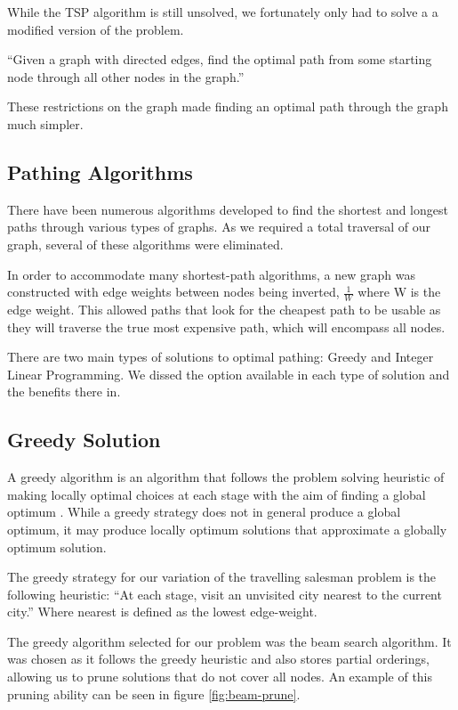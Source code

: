 \documentclass[bsc,frontabs,twoside,singlespacing,parskip,deptreport]{infthesis}     %
\begin{document}
While the TSP algorithm is still unsolved, we fortunately only had to solve a a modified version of the problem.\\

\begin{center}
  \enquote{Given a graph with directed edges, find the optimal path from some starting node through all other nodes in
  the graph.}
\end{center}

These restrictions on the graph made finding an optimal path through the graph much simpler.


\subsection{Pathing Algorithms}
There have been numerous algorithms developed to find the shortest and longest paths through various types of graphs.
As we required a total traversal of our graph, several of these algorithms were eliminated.

In order to accommodate many shortest-path algorithms, a new graph was constructed with edge weights between nodes being inverted,
$\frac{1}{W}$ where W is the edge weight. This allowed paths that look for the cheapest path to be usable as they will traverse the
true most expensive path, which will encompass all nodes.

There are two main types of solutions to optimal pathing: Greedy and Integer Linear Programming.
We dissed the option available in each type of solution and the benefits there in.

\subsection{Greedy Solution}
A greedy algorithm is an algorithm that follows the problem solving heuristic of making locally optimal choices at each stage with the aim
of finding a global optimum \cite{black2004dictionary}.
While a greedy strategy does not in general produce a global optimum, it may produce locally optimum solutions that approximate a globally optimum solution.


The greedy strategy for our variation of the travelling salesman problem is the following heuristic:
``At each stage, visit an unvisited city nearest to the current city.''
Where nearest is defined as the lowest edge-weight.


The greedy algorithm selected for our problem was the beam search algorithm.
It was chosen as it follows the greedy heuristic and also stores partial orderings, allowing us to prune solutions that do not cover all nodes.
An example of this pruning ability can be seen in figure \ref{fig:beam-prune}.
\end{document}
